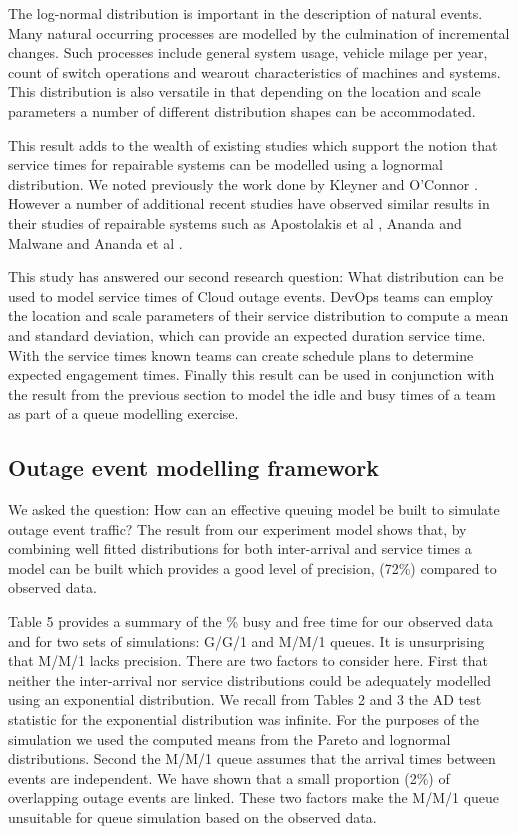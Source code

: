 \documentclass[5p]{elsarticle}
\begin{document}
The log-normal distribution is important in the description of natural events. Many natural occurring processes are modelled by the culmination of incremental changes. Such processes include general system usage, vehicle milage per year, count of switch operations and wearout characteristics of machines and systems. This distribution is also versatile in that depending on the location and scale parameters a number of different distribution shapes can be accommodated. 

This result adds to the wealth of existing studies which support the notion that service times for repairable systems can be modelled using a lognormal distribution. We noted previously the work done by Kleyner and O'Connor \cite{o2011practical}. However a number of additional recent studies have observed similar results in their studies of repairable systems such as Apostolakis et al  \cite{apostolakis1980synthesis}, Ananda and Malwane \cite{ananda2003confidence} and Ananda et al \cite{ananda2004steady}. 

This study has answered our second research question: What distribution can be used to model service times of Cloud outage events. DevOps teams can employ the location and scale parameters of their service distribution to compute a mean and standard deviation, which can provide an expected duration service time. With the service times known teams can create schedule plans to determine expected engagement times. Finally this result can be used in conjunction with the result from the previous section to model the idle and busy times of a team as part of a queue modelling exercise.


\subsection{Outage event modelling framework}

We asked the question: How can an effective queuing model be built to simulate outage event traffic? The result from our experiment model shows that, by combining well fitted distributions for both inter-arrival and service times a model can be built which provides a good level of precision, (72\%) compared to observed data. 

Table 5 provides a summary of the \% busy and free time for our observed data and for two sets of simulations: G/G/1 and M/M/1 queues. It is unsurprising that M/M/1 lacks precision. There are two factors to consider here. First that neither the inter-arrival nor service distributions could be adequately modelled using an exponential distribution. We recall from Tables 2 and 3 the AD test statistic for the exponential distribution was infinite. For the purposes of the simulation we used the computed means from the Pareto and lognormal distributions. Second the M/M/1 queue assumes that the arrival times between events are independent. We have shown that a small proportion (2\%) of overlapping outage events are linked. These two factors make the M/M/1 queue unsuitable for queue simulation based on the observed data.
\end{document}
